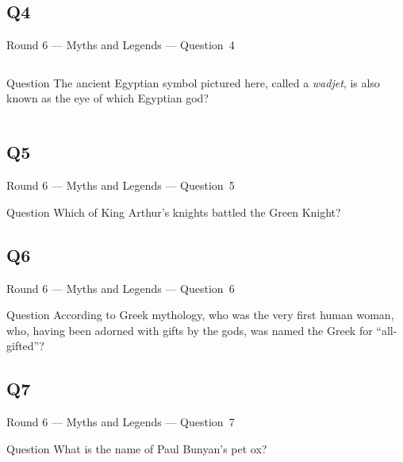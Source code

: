 \documentclass[11pt,draft]{beamer}
\begin{document}
\subsection*{Q4}
\begin{frame}[t]{Round 6 --- Myths and Legends --- \mbox{Question 4}}
    \begin{columns}[T,totalwidth=\linewidth]
        \begin{column}{0.32\linewidth}
            \begin{block}{Question}
                The ancient Egyptian symbol pictured here, called a \emph{wadjet}, is also known as the eye of which Egyptian god?
            \end{block}
        \end{column}
        \begin{column}{0.65\linewidth}
            \begin{center}
                \texttt{[image: \{Images/wadget]}.png}
            \end{center}
        \end{column}
    \end{columns}
\end{frame}
\subsection*{Q5}
\begin{frame}[t]{Round 6 --- Myths and Legends --- \mbox{Question 5}}
    \begin{block}{Question}
        Which of King Arthur's knights battled the Green Knight?
    \end{block}
\end{frame}
\subsection*{Q6}
\begin{frame}[t]{Round 6 --- Myths and Legends --- \mbox{Question 6}}
    \begin{block}{Question}
        According to Greek mythology, who was the very first human woman, who, having been adorned with gifts by the gods, was named the Greek for ``all-gifted''?
    \end{block}
\end{frame}
\subsection*{Q7}
\begin{frame}[t]{Round 6 --- Myths and Legends --- \mbox{Question 7}}
    \begin{block}{Question}
        What is the name of Paul Bunyan's pet ox?
    \end{block}
\end{frame}
\end{document}
